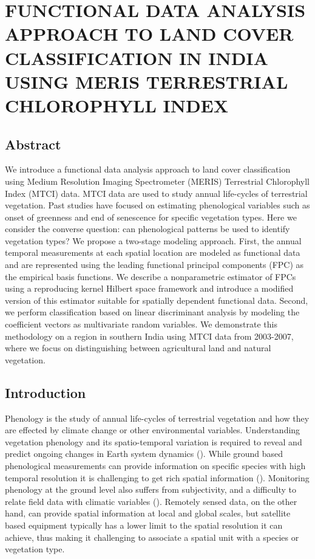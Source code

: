 

\chapter{FUNCTIONAL DATA ANALYSIS APPROACH TO LAND COVER CLASSIFICATION IN INDIA USING MERIS TERRESTRIAL CHLOROPHYLL INDEX} \label{phenology}

\section{Abstract}

We introduce a functional data analysis approach to land cover classification using Medium Resolution Imaging Spectrometer (MERIS) Terrestrial Chlorophyll Index (MTCI) data. MTCI data are used to study annual life-cycles of terrestrial vegetation. Past studies have focused on estimating phenological variables such as onset of greenness and end of senescence for specific vegetation types. Here we consider the converse question: can phenological patterns be used to identify vegetation types? We propose a two-stage modeling approach. First, the annual temporal measurements at each spatial location are modeled as functional data and are represented using the leading functional principal components (FPC) as the empirical basis functions. We describe a nonparametric estimator of FPCs using a reproducing kernel Hilbert space framework and introduce a modified version of this estimator suitable for spatially dependent functional data. Second, we perform classification based on linear discriminant analysis by modeling the coefficient vectors as multivariate random variables. We demonstrate this methodology on a region in southern India using MTCI data from 2003-2007, where we focus on distinguishing between agricultural land and natural vegetation.

\section{Introduction}

Phenology is the study of annual life-cycles of terrestrial vegetation and how they are effected by climate change or other environmental variables. Understanding vegetation phenology and its spatio-temporal variation is required to reveal and predict ongoing changes in Earth system dynamics (\cite{Jeganathan:2010gqa}). While ground based phenological measurements can provide information on specific species with high temporal resolution it is challenging to get rich spatial information (\cite{Studer:2007hd}). Monitoring phenology at the ground level also suffers from subjectivity, and a difficulty to relate field data with climatic variables (\cite{Jeganathan:2010gqa}). Remotely sensed data, on the other hand, can provide spatial information at local and global scales, but satellite based equipment typically has a lower limit to the spatial resolution it can achieve, thus making it challenging to associate a spatial unit with a species or vegetation type. 

